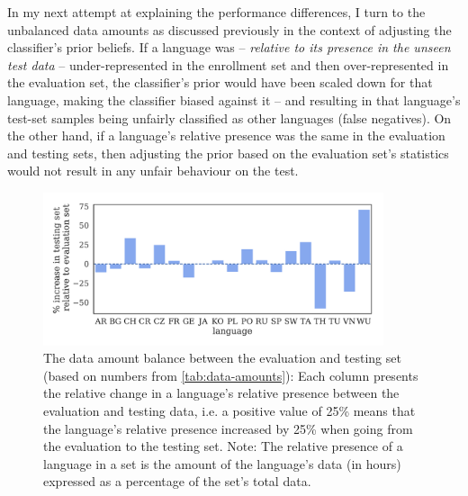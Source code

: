 \documentclass[bsc,frontabs,twoside,singlespacing,parskip,deptreport]{infthesis}
\begin{document}
{{    In my next attempt at explaining the performance differences, I turn to the unbalanced data amounts as discussed previously in the context of adjusting the classifier's prior beliefs. If a language was -- \textit{relative to its presence in the unseen test data} -- under-represented in the enrollment set and then over-represented in the evaluation set, the classifier's prior would have been scaled down for that language, making the classifier biased against it -- and resulting in that language's test-set samples being unfairly classified as other languages (false negatives). On the other hand, if a language's relative presence was the same in the evaluation and testing sets, then adjusting the prior based on the evaluation set's statistics would not result in any unfair behaviour on the test.

    \begin{figure}[h!t]
      \centering
      \includegraphics[width=10cm]{../img/eval-test-balance.pdf}
      \vspace*{-1.2em}
      \caption{The data amount balance between the evaluation and testing set (based on numbers from \autoref{tab:data-amounts}): Each column presents the relative change in a language's relative presence between the evaluation and testing data, i.e. a positive value of 25\% means that the language's relative presence increased by 25\% when going from the evaluation to the testing set. Note: The relative presence of a language in a set is the amount of the language's data (in hours) expressed as a percentage of the set's total data.}
      \label{fig:eval-test-balance}
    \end{figure}

}}
\end{document}

